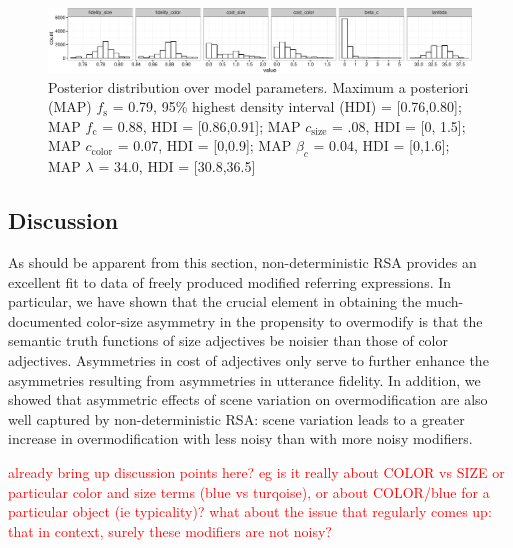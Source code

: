 \documentclass[11pt]{article}
\newcommand{\red}[1]{\textcolor{Red}{#1}}
\begin{document}
\begin{figure}
\centering
\includegraphics[width=\textwidth]{../../../models/1a_bda_basic/results_bda/graphs/parameterposteriors-fixed-reducedconditions-unlogged}
\caption{Posterior distribution over model parameters. Maximum a posteriori (MAP)  $f_{\textrm{s}}$ = 0.79, 95\% highest density interval (HDI) = [0.76,0.80]; MAP $f_{\textrm{c}}$ = 0.88, HDI = [0.86,0.91]; MAP $c_{\textrm{size}}$ = .08, HDI = [0, 1.5]; MAP $c_{\textrm{color}}$ = 0.07, HDI = [0,0.9]; MAP $\beta_c$ = 0.04, HDI = [0,1.6]; MAP $\lambda$ = 34.0, HDI = [30.8,36.5]}
\label{fig:modifierparamposteriors}
\end{figure}

\subsection{Discussion}

As should be apparent from this section, non-deterministic RSA provides an excellent fit to data of freely produced modified referring expressions. In particular, we have shown that the crucial element in obtaining the much-documented color-size asymmetry in the propensity to overmodify is that the semantic truth functions of size adjectives be noisier than those of color adjectives. Asymmetries in cost of adjectives  only serve to further enhance the asymmetries resulting from asymmetries in utterance fidelity. In addition, we showed that asymmetric effects of scene variation on overmodification are also well captured by non-deterministic RSA: scene variation leads to a greater increase in overmodification with less noisy than with more noisy modifiers.

\red{already bring up discussion points here? eg is it really about COLOR vs SIZE or particular color and size terms (blue vs turqoise), or about COLOR/blue for a particular object (ie typicality)? what about the issue that regularly comes up: that in context, surely these modifiers are not noisy?}
\end{document}
